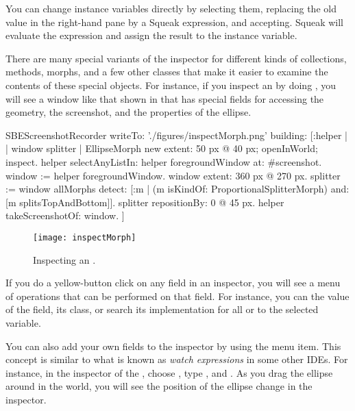 \documentclass[a4paper,10pt,twoside]{book}
\begin{document}
You can change instance variables directly by selecting them, replacing the old value in the right-hand pane by a Squeak expression, and accepting.
Squeak will evaluate the expression and assign the result to the instance variable.

There are many special variants of the inspector for different kinds of collections, methods, morphs, and a few other classes that make it easier to examine the contents of these special objects.
For instance, if you inspect an  by doing , you will see a window like that shown in  that has special fields for accessing the geometry, the screenshot, and the properties of the ellipse.

\begin{ExecuteSmalltalkScript}
SBEScreenshotRecorder writeTo: './figures/inspectMorph.png' building: [:helper | | window splitter |
	EllipseMorph new extent: 50 px @ 40 px; openInWorld; inspect.
	helper selectAnyListIn: helper foregroundWindow at: #screenshot.
	window := helper foregroundWindow.
	window extent: 360 px @ 270 px.
	splitter := window allMorphs detect: [:m |
		(m isKindOf: ProportionalSplitterMorph) and: [m splitsTopAndBottom]].
	splitter repositionBy: 0 @ 45 px.
	helper takeScreenshotOf: window.
]
\end{ExecuteSmalltalkScript}

\begin{figure}[btp]
	\begin{center}
		\texttt{[image: inspectMorph]}
	\end{center}
	\caption{Inspecting an .}
	\label{fig:inspectMorph}
\end{figure}

If you do a yellow-button click on any field in an inspector, you will see a menu of operations that can be performed on that field.
For instance, you can  the value of the field,  its class, or search its implementation for all  or  to the selected variable.

You can also add your own fields to the inspector by using the  menu item.
This concept is similar to what is known as \emph{watch expressions} in some other IDEs.
For instance, in the inspector of the , choose , type , and .
As you drag the ellipse around in the world, you will see the position of the ellipse change in the inspector.
\end{document}
